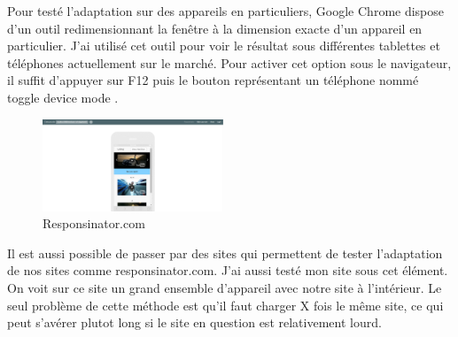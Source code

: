 \documentclass{article}
\begin{document}
Pour test\'e l'adaptation sur des appareils en particuliers, Google Chrome dispose d'un outil redimensionnant la fen\^etre \`a la dimension exacte d'un appareil en particulier. J'ai utilis\'e cet outil pour voir le r\'esultat sous diff\'erentes tablettes et t\'el\'ephones actuellement sur le march\'e. Pour activer cet option sous le navigateur, il suffit d'appuyer sur F12 puis le bouton repr\'esentant un t\'el\'ephone nomm\'e \og toggle device mode \fg{}.
\vspace{0.5cm}\\
\begin{figure}
  \vspace{-25pt}
  \begin{center}
    \includegraphics[width=0.48\textwidth]{p17}
  \end{center}
  \vspace{-20pt}
  \caption{Responsinator.com}
  \vspace{-10pt}
\end{figure} 

Il est aussi possible de passer par des sites qui permettent de tester l'adaptation de nos sites comme responsinator.com. J'ai aussi test\'e mon site sous cet \'el\'ement. On voit sur ce site un grand ensemble d'appareil avec notre site \`a l'int\'erieur. Le seul probl\`eme de cette m\'ethode est qu'il faut charger X fois le m\^eme site, ce qui peut s'av\'erer plutot long si le site en question est relativement lourd.\\

\newpage
\end{document}
